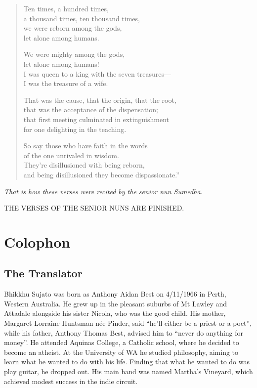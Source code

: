 \documentclass[12pt,openany]{book}%
\newcommand*{\scendsutta}[1]{\begin{Center}\textit{#1}\end{Center}\addvspace{1em}}
\newcommand*{\scendbook}[1]{\bigskip\begin{Center}\uppercase{#1}\end{Center}\addvspace{1em}}
\let\oldbackmatter\backmatter
\renewcommand{\backmatter}{%
\chapterfont{\setstretch{.85}\normalfont\centering}%
\sectionfont{\setstretch{.85}\normalfont\BalancedRagged}%
\pagestyle{plainer}%
\oldbackmatter}
\begin{document}
\begin{verse}
Ten times, a hundred times, \\
a thousand times, ten thousand times, \\
we were reborn among the gods, \\
let alone among humans. 

We were mighty among the gods, \\
let alone among humans! \\
I was queen to a king with the seven treasures—\\
I was the treasure of a wife. 

That was the cause, that the origin, that the root, \\
that was the acceptance of the dispensation; \\
that first meeting culminated in extinguishment \\
for one delighting in the teaching. 

So say those who have faith in the words \\
of the one unrivaled in wisdom. \\
They’re disillusioned with being reborn, \\
and being disillusioned they become dispassionate.” 

%
\end{verse}

\scendsutta{That is how these verses were recited by the senior nun \textsanskrit{Sumedhā}. }

\scendbook{The Verses of the Senior Nuns are finished. }

%
\backmatter%
\chapter*{Colophon}

\section*{The Translator}

Bhikkhu Sujato was born as Anthony Aidan Best on 4/11/1966 in Perth, Western Australia. He grew up in the pleasant suburbs of Mt Lawley and Attadale alongside his sister Nicola, who was the good child. His mother, Margaret Lorraine Huntsman née Pinder, said “he’ll either be a priest or a poet”, while his father, Anthony Thomas Best, advised him to “never do anything for money”. He attended Aquinas College, a Catholic school, where he decided to become an atheist. At the University of WA he studied philosophy, aiming to learn what he wanted to do with his life. Finding that what he wanted to do was play guitar, he dropped out. His main band was named Martha’s Vineyard, which achieved modest success in the indie circuit. 
\end{document}
